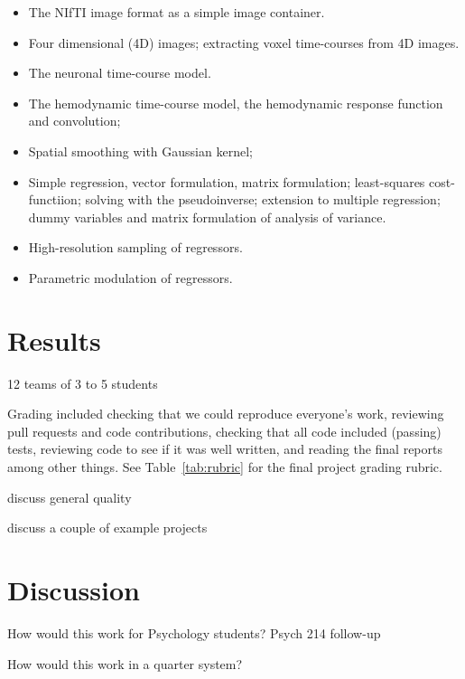 \begin{itemize}

\item The NIfTI image format as a simple image container.
\item Four dimensional (4D) images; extracting voxel time-courses from 4D
    images.
\item The neuronal time-course model.
\item The hemodynamic time-course model, the hemodynamic response function and
    convolution;
\item Spatial smoothing with Gaussian kernel;
\item Simple regression, vector formulation, matrix formulation; least-squares
    cost-functiion; solving with the pseudoinverse; extension to multiple
        regression; dummy variables and matrix formulation of analysis of
        variance.
\item High-resolution sampling of regressors.
\item Parametric modulation of regressors.

\end{itemize}

\section{Results}\label{results}

12 teams of 3 to 5 students

Grading included checking that we could reproduce everyone's work, reviewing pull
requests and code contributions, checking that all code included
(passing) tests, reviewing code to see if it was well written, and
reading the final reports among other things. 
See Table~\ref{tab:rubric} for the final project grading rubric.


discuss general quality

discuss a couple of example projects
\citep{tom2007neural}

\section{Discussion}\label{discussion}

How would this work for Psychology students?  Psych 214 follow-up

How would this work in a quarter system?

